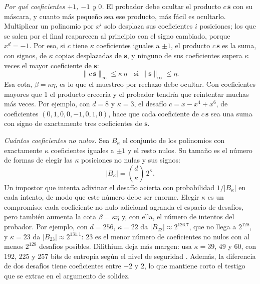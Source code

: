 \textit{Por qué coeficientes $+1$, $-1$ y $0$.} El probador debe ocultar el producto $c\,\mathbf{s}$ con su máscara, y cuanto más pequeño sea ese producto, más fácil es ocultarlo. Multiplicar un polinomio por $x^i$ solo desplaza sus coeficientes $i$ posiciones; los que se salen por el final reaparecen al principio con el signo cambiado, porque $x^{d} = -1$. Por eso, si $c$ tiene $\kappa$ coeficientes iguales a $\pm 1$, el producto $c\,\mathbf{s}$ es la suma, con signos, de $\kappa$ copias desplazadas de $\mathbf{s}$, y ninguno de sus coeficientes supera $\kappa$ veces el mayor coeficiente de $\mathbf{s}$:
\begin{equation}
\|c\,\mathbf{s}\|_\infty \le \kappa\,\eta \quad \text{si } \|\mathbf{s}\|_\infty \le \eta.
\end{equation}
Esa cota, $\beta = \kappa\eta$, es lo que el muestreo por rechazo debe ocultar. Con coeficientes mayores que 1 el producto crecería y el probador tendría que reintentar muchas más veces. Por ejemplo, con $d = 8$ y $\kappa = 3$, el desafío $c = x - x^4 + x^6$, de coeficientes $(0, 1, 0, 0, -1, 0, 1, 0)$, hace que cada coeficiente de $c\,\mathbf{s}$ sea una suma con signo de exactamente tres coeficientes de $\mathbf{s}$.

\textit{Cuántos coeficientes no nulos.} Sea $B_\kappa$ el conjunto de los polinomios con exactamente $\kappa$ coeficientes iguales a $\pm 1$ y el resto nulos. Su tamaño es el número de formas de elegir las $\kappa$ posiciones no nulas y sus signos:
\begin{equation}
|B_\kappa| = \binom{d}{\kappa}\, 2^{\kappa}.
\end{equation}
Un impostor que intenta adivinar el desafío acierta con probabilidad $1/|B_\kappa|$ en cada intento, de modo que este número debe ser enorme. Elegir $\kappa$ es un compromiso: cada coeficiente no nulo adicional agranda el espacio de desafíos, pero también aumenta la cota $\beta = \kappa\eta$ y, con ella, el número de intentos del probador. Por ejemplo, con $d = 256$, $\kappa = 22$ da $|B_{22}| \approx 2^{126.7}$, que no llega a $2^{128}$, y $\kappa = 23$ da $|B_{23}| \approx 2^{131.1}$: 23 es el menor número de coeficientes no nulos con al menos $2^{128}$ desafíos posibles. Dilithium deja más margen: usa $\kappa = 39$, $49$ y $60$, con 192, 225 y 257 bits de entropía según el nivel de seguridad \cite{bai2021dilithium}. Además, la diferencia de dos desafíos tiene coeficientes entre $-2$ y $2$, lo que mantiene corto el testigo que se extrae en el argumento de solidez.

